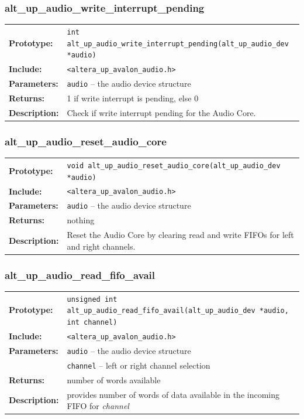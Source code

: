 \subsubsection{alt\_up\_audio\_write\_interrupt\_pending}
\begin{tabular}[ht]{lp{11cm}}
	\textbf{Prototype:}
	&
	\texttt{int alt\_up\_audio\_write\_interrupt\_pending(alt\_up\_audio\_dev *audio)} 
	\\
	\textbf{Include:}
	&
	{\tt <altera\_up\_avalon\_audio.h>}
	\\
	{\textbf{Parameters:}}
	&
	\texttt{{audio}}
	 -- the audio device structure 
	\\
	\textbf{Returns:}
	& 1 if write interrupt is pending, else 0
	\\
	\textbf{Description:}
	& Check if write interrupt pending for the Audio Core.\\
\end{tabular}
\vfill

\subsubsection{alt\_up\_audio\_reset\_audio\_core}
\begin{tabular}[ht]{lp{11cm}}
	\textbf{Prototype:}
	&
	\texttt{void alt\_up\_audio\_reset\_audio\_core(alt\_up\_audio\_dev *audio)} 
	\\
	\textbf{Include:}
	&
	{\tt <altera\_up\_avalon\_audio.h>}
	\\
	{\textbf{Parameters:}}
	&
	\texttt{{audio}}
	 -- the audio device structure 
	\\
	\textbf{Returns:}
	& nothing
	\\
	\textbf{Description:}
	& Reset the Audio Core by clearing read and write FIFOs for left and right channels.\\
\end{tabular}
\vfill

\subsubsection{alt\_up\_audio\_read\_fifo\_avail}
\begin{tabular}[ht]{lp{11cm}}
	\textbf{Prototype:}
	&
	\texttt{unsigned int alt\_up\_audio\_read\_fifo\_avail(alt\_up\_audio\_dev *audio, int channel)} 
	\\
	\textbf{Include:}
	&
	{\tt <altera\_up\_avalon\_audio.h>}
	\\
	{\textbf{Parameters:}}
	&
	\texttt{{audio}}
	 -- the audio device structure 
	\\
	&
	\texttt{{channel}}
	 -- left or right channel selection 
	\\
	\textbf{Returns:}
	& number of words available
	\\
	\textbf{Description:}
	& provides number of words of data available in the incoming FIFO for {\it channel} \\
\end{tabular}
\vfill

